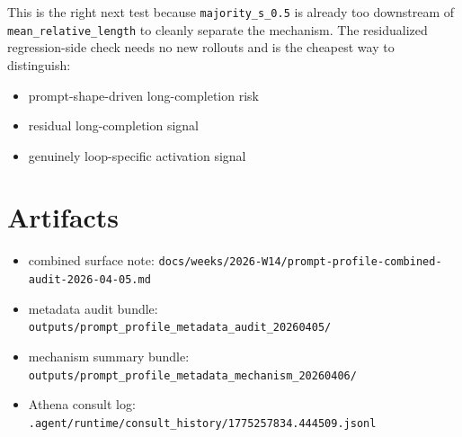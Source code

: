 \documentclass[11pt]{article}
\begin{document}
This is the right next test because \texttt{majority\_s\_0.5} is already too downstream of \texttt{mean\_relative\_length} to cleanly separate the mechanism. The residualized regression-side check needs no new rollouts and is the cheapest way to distinguish:
\begin{itemize}[leftmargin=1.5em]
\item prompt-shape-driven long-completion risk
\item residual long-completion signal
\item genuinely loop-specific activation signal
\end{itemize}

\section*{Artifacts}
\begin{itemize}[leftmargin=1.5em]
\item combined surface note: \texttt{docs/weeks/2026-W14/prompt-profile-combined-audit-2026-04-05.md}
\item metadata audit bundle: \texttt{outputs/prompt\_profile\_metadata\_audit\_20260405/}
\item mechanism summary bundle: \texttt{outputs/prompt\_profile\_metadata\_mechanism\_20260406/}
\item Athena consult log: \texttt{.agent/runtime/consult\_history/1775257834.444509.jsonl}
\end{itemize}
\end{document}
